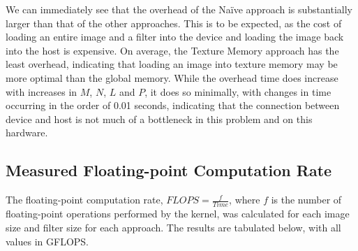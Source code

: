 \documentclass[10pt]{article}
\begin{document}
We can immediately see that the overhead of the Na\"{i}ve approach is substantially larger than that of the other approaches. This is to be expected, as the cost of loading an entire image and a filter into the device and loading the image back into the host is expensive. On average, the Texture Memory approach has the least overhead, indicating that loading an image into texture memory may be more optimal than the global memory. While the overhead time does increase with increases in $M$, $N$, $L$ and $P$, it does so minimally, with changes in time occurring in the order of 0.01 seconds, indicating that the connection between device and host is not much of a bottleneck in this problem and on this hardware.
\subsection{Measured Floating-point Computation Rate}
The floating-point computation rate, $FLOPS = \frac{f}{Time}$, where $f$ is the number of floating-point operations performed by the kernel, was calculated for each image size and filter size for each approach. The results are tabulated below, with all values in GFLOPS.
\end{document}

